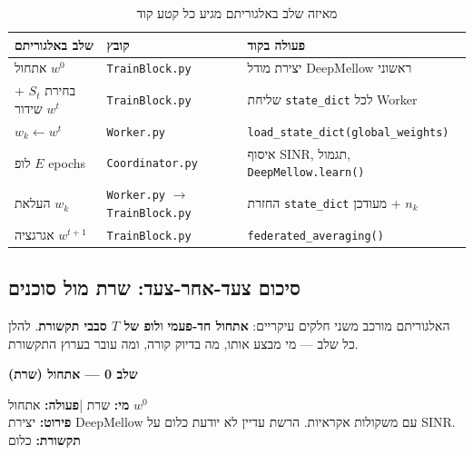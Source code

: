 \documentclass[11pt,a4paper]{article}
\newenvironment{infobox}[2][gray]{%
  \par\smallskip
  \begin{mdframed}[
    linecolor=#1!60!black,
    linewidth=0.7pt,
    backgroundcolor=#1!6,
    roundcorner=3pt,
    innertopmargin=7pt,
    innerbottommargin=7pt,
    innerleftmargin=8pt,
    innerrightmargin=8pt,
    skipabove=6pt,
    skipbelow=6pt
  ]%
  {\color{#1!70!black}\bfseries #2}\par\smallskip
}{%
  \end{mdframed}%
  \par\smallskip
}
\newenvironment{stepbox}[1]{\begin{infobox}[gray]{#1}}{\end{infobox}}
\begin{document}
\begin{table}[H]
  \centering
  \caption{מאיזה שלב באלגוריתם מגיע כל קטע קוד}
  \label{tab:code-mapping}
  \begin{tabular}{@{}>{\raggedright\arraybackslash}p{3cm}>{\raggedright\arraybackslash}p{4.2cm}>{\raggedright\arraybackslash}p{5.5cm}@{}}
    \toprule
    \textbf{שלב באלגוריתם} & \textbf{קובץ} & \textbf{פעולה בקוד} \\
    \midrule
    אתחול $w^0$ &
    \texttt{TrainBlock.py} &
    יצירת מודל DeepMellow ראשוני \\
    \addlinespace
    בחירת $S_t$ + שידור $w^t$ &
    \texttt{TrainBlock.py} &
    שליחת \texttt{state\_dict} לכל Worker \\
    \addlinespace
    $w_k \leftarrow w^t$ &
    \texttt{Worker.py} &
    \texttt{load\_state\_dict(global\_weights)} \\
    \addlinespace
    לופ $E$ epochs &
    \texttt{Coordinator.py} &
    איסוף SINR, תגמול, \texttt{DeepMellow.learn()} \\
    \addlinespace
    העלאת $w_k$ &
    \texttt{Worker.py} $\to$ \texttt{TrainBlock.py} &
    החזרת \texttt{state\_dict} מעודכן + $n_k$ \\
    \addlinespace
    אגרגציה $w^{t+1}$ &
    \texttt{TrainBlock.py} &
    \texttt{federated\_averaging()} \\
    \bottomrule
  \end{tabular}
\end{table}

\subsection{סיכום צעד-אחר-צעד: שרת מול סוכנים}
\label{subsec:step-by-step-summary}

האלגוריתם מורכב משני חלקים עיקריים: \textbf{אתחול חד-פעמי} ו\textbf{לופ של $T$ סבבי תקשורת}.
להלן כל שלב --- מי מבצע אותו, מה בדיוק קורה, ומה עובר בערוץ התקשורת.

\begin{stepbox}{שלב 0 --- אתחול (שרת)}
\textbf{מי:} שרת \quad|\quad \textbf{פעולה:} אתחול $w^0$\\[4pt]
\textbf{פירוט:} יצירת DeepMellow עם משקולות אקראיות. הרשת עדיין לא יודעת כלום על SINR.\\[4pt]
\textbf{תקשורת:} כלום
\end{stepbox}
\end{document}

